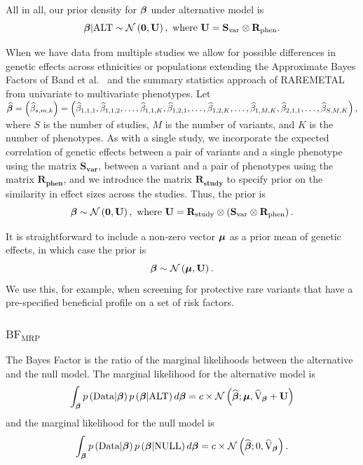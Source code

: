 All in all, our prior density for ${\boldsymbol \beta}$ under alternative model is 
$${\boldsymbol {\beta}}|\textrm{ALT} \sim \mathcal{N}\left(\mathbf{0}, \mathbf{U}\right), \textrm{ where } \mathbf{U} = \mathbf{S}_{\textrm{var}} \otimes \mathbf{R}_{\textrm{phen}}.$$

When we have data from multiple studies 
we allow for possible differences in genetic effects across ethnicities or populations 
extending the Approximate Bayes Factors of Band et al.~\cite{band2013imputation}
and the summary statistics approach of RAREMETAL~\cite{liu2014meta} from univariate to multivariate phenotypes.
Let $\boldsymbol {\widehat{ \beta}} = \left(\widehat{ \beta}_{s,m,k}\right)=\left(\widehat{\beta}_{1,1,1}, \widehat{\beta}_{1,1,2}, \dots, \widehat{\beta}_{1,1,K}, \widehat{\beta}_{1,2,1}, \dots, \widehat{\beta}_{1,2,K}, \dots, \widehat{\beta}_{1,M,K}, \widehat{\beta}_{2,1,1}, \dots, \widehat{\beta}_{S,M,K}\right),$ where $S$ is the number of studies, $M$ is the number of variants, and $K$ is the number of phenotypes. 
As with a single study, we incorporate the expected correlation of genetic effects between a pair of variants and a single phenotype using the matrix $\mathbf{S_{\textrm{var}}}$, between a variant and a pair of phenotypes using the matrix $\mathbf{R_{\textrm{phen}}}$, and we introduce the matrix $\mathbf{R_{\textrm{study}}}$ to specify prior on the similarity in effect sizes across the studies.
Thus, the prior is
$${\boldsymbol {\beta}} \sim \mathcal{N}\left(\mathbf{0}, \mathbf{U}\right), \textrm{ where } 
\mathbf{U} = \mathbf{R}_{\textrm{study}}\otimes\left(\mathbf{S}_{\textrm{var}} \otimes \mathbf{R}_{\textrm{phen}}\right).$$

It is straightforward to include a non-zero vector ${\boldsymbol\mu}$ as a prior mean of genetic effects, in which case the prior is
$${\boldsymbol {\beta}} \sim \mathcal{N}\left({\boldsymbol \mu},\mathbf{U}\right).$$
We use this, for example, when screening for protective rare variants that have a pre-specified beneficial profile on a set of risk factors.


\subsubsection*{$\textrm{BF}_{\textrm{MRP}}$} 
\label{bfmodel}
The Bayes Factor is the ratio of the marginal likelihoods between the alternative and the null model. 
The marginal likelihood for the alternative model is 
$$ \int_{{\boldsymbol {\beta}}} p\left(\mathbf{\textrm{Data}}|{\boldsymbol {\beta}}\right) p\left({\boldsymbol {\beta}}|\textrm{ALT}\right)d{\boldsymbol {\beta}} = c \times \mathcal{N}\left({ {\widehat{\boldsymbol \beta}}}; {\boldsymbol \mu},  \widehat{\mathbf{\textrm{V}}}_{{\boldsymbol {\beta}}} + \mathbf{U}\right)$$
and the marginal likelihood for the null model is 
$$\int_{{\boldsymbol {\beta}}} p\left(\mathbf{\textrm{Data}}|{\boldsymbol {\beta}}\right) p\left({\boldsymbol {\beta}}|\textrm{NULL}\right)d{\boldsymbol {\beta}} = c \times \mathcal{N}\left({ {\widehat{\boldsymbol \beta}}}; 0,  \widehat{\mathbf{\textrm{V}}}_{{\boldsymbol {\beta}}}\right).$$

